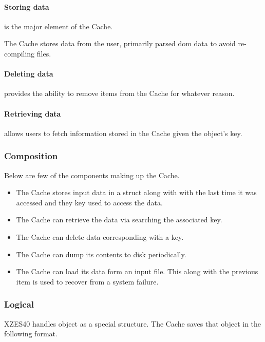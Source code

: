 \paragraph{Storing data} is the major element of the Cache.

The Cache stores data from the user, primarily parsed \gls{dom} data to avoid re-compiling files.

\paragraph{Deleting data} provides the ability to remove items from the Cache for whatever reason.

\paragraph{Retrieving data} allows users to fetch information stored in the Cache given the object's key.

\subsubsection{Composition}

Below are few of the components making up the Cache.

\begin{itemize}
    \item The Cache stores input data in a \gls{struct} along with with the last time it was accessed and they key used to access the data.
    \item The Cache can retrieve the data via searching the associated key.
    \item The Cache can delete data corresponding with a key.
    \item The Cache can dump its contents to disk periodically.
    \item {
      The Cache can load its data form an input file.
      This along with the previous item is used to recover from a system failure.
    }
\end{itemize}

\subsubsection{Logical}

XZES40 handles object as a special structure.
The Cache saves that object in the following format.

